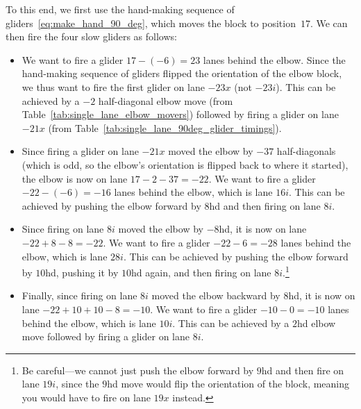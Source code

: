 To this end, we first use the hand-making sequence of gliders~\eqref{eq:make_hand_90_deg}, which moves the block to position~$17$. We can then fire the four slow gliders as follows:\smallskip

\begin{itemize}
	\item We want to fire a glider $17 - (-6) = 23$ lanes behind the elbow. Since the hand-making sequence of gliders flipped the orientation of the elbow block, we thus want to fire the first glider on lane $-23x$ (not $-23i$). This can be achieved by a $-2$ half-diagonal elbow move (from Table~\ref{tab:single_lane_elbow_movers}) followed by firing a glider on lane $-21x$ (from Table~\ref{tab:single_lane_90deg_glider_timings}).\smallskip
	
	\item Since firing a glider on lane $-21x$ moved the elbow by $-37$ half-diagonals (which is odd, so the elbow's orientation is flipped back to where it started), the elbow is now on lane $17 - 2 - 37 = -22$. We want to fire a glider $-22 - (-6) = -16$ lanes behind the elbow, which is lane $16i$. This can be achieved by pushing the elbow forward by $8$hd and then firing on lane $8i$.\smallskip
	
	\item Since firing on lane $8i$ moved the elbow by $-8$hd, it is now on lane $-22 + 8 - 8 = -22$. We want to fire a glider $-22 - 6 = -28$ lanes behind the elbow, which is lane $28i$. This can be achieved by pushing the elbow forward by $10$hd, pushing it by $10$hd again, and then firing on lane $8i$.\footnote{Be careful---we cannot just push the elbow forward by $9$hd and then fire on lane $19i$, since the $9$hd move would flip the orientation of the block, meaning you would have to fire on lane $19x$ instead.}\smallskip
	
	\item Finally, since firing on lane $8i$ moved the elbow backward by $8$hd, it is now on lane $-22 + 10 + 10 - 8 = -10$. We want to fire a glider $-10 - 0 = -10$ lanes behind the elbow, which is lane $10i$. This can be achieved by a $2$hd elbow move followed by firing a glider on lane $8i$.\smallskip
\end{itemize}


